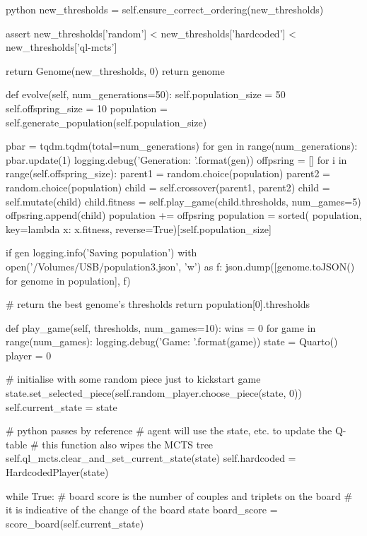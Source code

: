 \begin{mintedbox}{python}
            new_thresholds = self.ensure_correct_ordering(new_thresholds)

            assert new_thresholds['random'] < new_thresholds['hardcoded'] < new_thresholds['ql-mcts']

            return Genome(new_thresholds, 0)
        return genome

    def evolve(self, num_generations=50):
        self.population_size = 50
        self.offspring_size = 10
        population = self.generate_population(self.population_size)

        pbar = tqdm.tqdm(total=num_generations)
        for gen in range(num_generations):
            pbar.update(1)
            logging.debug('Generation: {}'.format(gen))
            offpsring = []
            for i in range(self.offspring_size):
                parent1 = random.choice(population)
                parent2 = random.choice(population)
                child = self.crossover(parent1, parent2)
                child = self.mutate(child)
                child.fitness = self.play_game(child.thresholds, num_games=5)
                offpsring.append(child)
            population += offpsring
            population = sorted(
                population, key=lambda x: x.fitness, reverse=True)[:self.population_size]

            if gen %
                logging.info('Saving population')
                with open('/Volumes/USB/population3.json', 'w') as f:
                    json.dump([genome.toJSON() for genome in population], f)

        # return the best genome's thresholds
        return population[0].thresholds

    def play_game(self, thresholds, num_games=10):
        wins = 0
        for game in range(num_games):
            logging.debug('Game: {}'.format(game))
            state = Quarto()
            player = 0

            # initialise with some random piece just to kickstart game
            state.set_selected_piece(self.random_player.choose_piece(state, 0))
            self.current_state = state

            # python passes by reference
            # agent will use the state, etc. to update the Q-table
            # this function also wipes the MCTS tree
            self.ql_mcts.clear_and_set_current_state(state)
            self.hardcoded = HardcodedPlayer(state)

            while True:
                # board score is the number of couples and triplets on the board
                # it is indicative of the change of the board state
                board_score = score_board(self.current_state)


\end{mintedbox}
